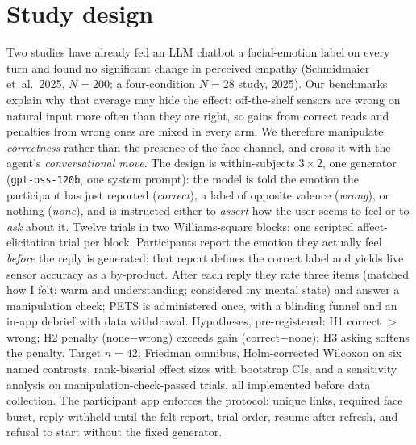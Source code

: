 \documentclass[sigconf,nonacm]{acmart}
\begin{document}
\section{Study design}\label{sec:study}
Two studies have already fed an LLM chatbot a facial-emotion label on every turn and found no significant change in perceived empathy (Schmidmaier et~al.\ 2025, $N\!=\!200$; a four-condition $N\!=\!28$ study, 2025). Our benchmarks explain why that average may hide the effect: off-the-shelf sensors are wrong on natural input more often than they are right, so gains from correct reads and penalties from wrong ones are mixed in every arm. We therefore manipulate \emph{correctness} rather than the presence of the face channel, and cross it with the agent's \emph{conversational move}. The design is within-subjects $3\!\times\!2$, one generator (\texttt{gpt-oss-120b}, one system prompt): the model is told the emotion the participant has just reported (\emph{correct}), a label of opposite valence (\emph{wrong}), or nothing (\emph{none}), and is instructed either to \emph{assert} how the user seems to feel or to \emph{ask} about it. Twelve trials in two Williams-square blocks; one scripted affect-elicitation trial per block. Participants report the emotion they actually feel \emph{before} the reply is generated; that report defines the correct label and yields live sensor accuracy as a by-product. After each reply they rate three items (matched how I felt; warm and understanding; considered my mental state) and answer a manipulation check; PETS is administered once, with a blinding funnel and an in-app debrief with data withdrawal. Hypotheses, pre-registered: H1 correct $>$ wrong; H2 penalty (none$-$wrong) exceeds gain (correct$-$none); H3 asking softens the penalty. Target $n\!=\!42$; Friedman omnibus, Holm-corrected Wilcoxon on six named contrasts, rank-biserial effect sizes with bootstrap CIs, and a sensitivity analysis on manipulation-check-passed trials, all implemented before data collection. The participant app enforces the protocol: unique links, required face burst, reply withheld until the felt report, trial order, resume after refresh, and refusal to start without the fixed generator.
\end{document}
